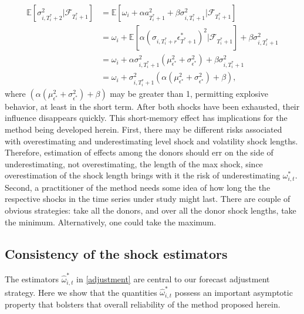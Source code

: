 \documentclass{uiucthesis2021}
\theoremstyle{definition}
\begin{document}
\begin{align*}
\mathbb{E}[ \sigma^{2}_{i,T_{i}^{*}+2} |\mathcal{F}_{T_{i}^{*}+1}] & = \mathbb{E}[\omega_{i} + \alpha a_{T_{i}^{*}+1}^{2} + \beta\sigma^{2}_{i,T_{i}^{*}+1} |\mathcal{F}_{T_{i}^{*}+1}] \\
& = \omega_{i} + \mathbb{E}[\alpha(\sigma_{i,T_{i}^{*}+r}\epsilon^{*}_{T^{*}+1})^{2} |\mathcal{F}_{T_{i}^{*}+1}] + \beta\sigma^{2}_{i,T_{i}^{*}+1} \\
& = \omega_{i} + \alpha\sigma^{2}_{i,T_{i}^{*}+1}(\mu^{2}_{\epsilon^{*}} + \sigma^{2}_{\epsilon^{*}}) + \beta\sigma^{2}_{i,T_{i}^{*}+1} \\
& = \omega_{i} + \sigma^{2}_{i,T_{i}^{*}+1}(\alpha(\mu^{2}_{\epsilon^{*}} + \sigma^{2}_{\epsilon^{*}}) + \beta)\text{,}
\end{align*}
where $(\alpha(\mu^{2}_{\epsilon^{*}} + \sigma^{2}_{\epsilon^{*}}) + \beta)$ may be greater than 1, permitting explosive behavior, at least in the short term.  After both shocks have been exhausted, their influence disappears quickly.  This short-memory effect has implications for the method being developed herein.  First, there may be different risks associated with overestimating and underestimating level shock and volatility shock lengths.  Therefore, estimation of effects among the donors should err on the side of underestimating, not overestimating, the length of the max shock, since overestimation of the shock length brings with it the risk of underestimating $\omega^{*}_{i,t}$.  Second, a practitioner of the method needs some idea of how long the the respective shocks in the time series under study might last.  There are couple of obvious strategies: take all the donors, and over all the donor shock lengths, take the minimum.  Alternatively, one could take the maximum.

\subsection{Consistency of the shock estimators}

The estimators $\hat\omega^{*}_{i,t}$ in \eqref{adjustment} are central to our forecast adjustment strategy.  Here we show that the quantities $\hat\omega^{*}_{i,t}$ possess an important asymptotic property that bolsters that overall reliability of the method proposed herein.
\end{document}
